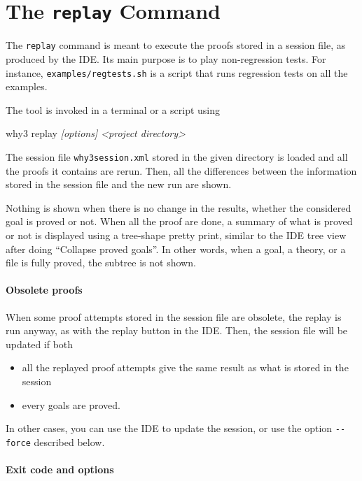 \section{The \texttt{replay} Command}
\label{sec:why3replayer}

The \texttt{replay} command is meant to execute the proofs
stored in a \why session file, as produced by the IDE. Its
main purpose is to play non-regression tests. For instance,
\texttt{examples/regtests.sh} is a script that runs regression tests on
all the examples.

The tool is invoked in a terminal or a script using
\begin{flushleft}\ttfamily
  why3 replay \textsl{[options] <project directory>}
\end{flushleft}
The session file \texttt{why3session.xml} stored in the given
directory is loaded and all the proofs it contains are rerun. Then,
all the differences between the information stored in the session file and
the new run are shown.

Nothing is shown when there is no change in the results, whether the
considered goal is proved or not. When all the proof
are done, a summary of what is proved or not is displayed using a
tree-shape pretty print, similar to the IDE tree view after doing
``Collapse proved goals''. In other words, when a goal, a theory, or a
file is fully proved, the subtree is not shown.

\paragraph{Obsolete proofs}

When some proof attempts stored in the session file are
obsolete,
the replay is run anyway, as with the replay button in the IDE. Then, the session
file will be updated if both
\begin{itemize}
\item all the replayed proof attempts give the same result as what
  is stored in the session
\item every goals are proved.
\end{itemize}
In other cases, you can use the IDE to update the session, or use the
option \verb|--force| described below.

\paragraph{Exit code and options}

